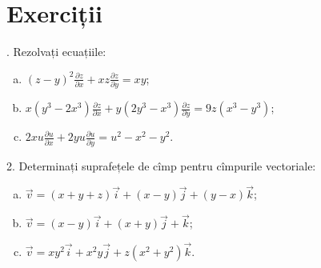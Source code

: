 \documentclass[11pt,a4paper]{article}
\theoremstyle{dotless}
\theoremstyle{dotlessdr}
\begin{document}






\section{Exerciții}

. Rezolvați ecuațiile:
\begin{enumerate}[(a)]
\item $ (z - y)^2 \frac{\partial z}{\partial x} + xz \frac{\partial z}{\partial y} = xy $;
\item $ x(y^3 - 2x^3) \frac{\partial z}{\partial x} + %
  y(2y^3 - x^3) \frac{\partial z}{\partial y} = 9z(x^3 - y^3) $;
\item $ 2xu \frac{\partial u}{\partial x} + 2yu \frac{\partial u}{\partial y} = %
  u^2 - x^2 - y^2 $.
\end{enumerate}

\vspace{1cm}

2. Determinați suprafețele de cîmp pentru cîmpurile vectoriale:
\begin{enumerate}[(a)]
\item $ \vec{v} = (x + y + z)\vec{i} + (x - y)\vec{j} + (y - x)\vec{k} $;
\item $ \vec{v} = (x - y)\vec{i} + (x + y) \vec{j} + \vec{k} $;
\item $ \vec{v} = xy^2 \vec{i} + x^2y \vec{j} + z(x^2 + y^2) \vec{k}$.
\end{enumerate}
\end{document}

